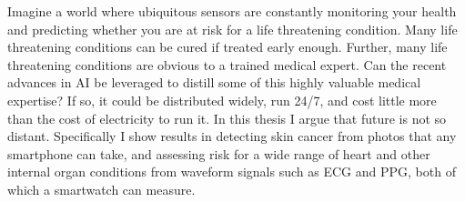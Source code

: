 Imagine a world where ubiquitous sensors are constantly monitoring your health and predicting whether you are at risk for a life threatening condition.  Many life threatening conditions can be cured if treated early enough.  Further, many life threatening conditions are obvious to a trained medical expert.  Can the recent advances in AI be leveraged to distill some of this highly valuable medical expertise?  If so, it could be distributed widely, run 24/7, and cost little more than the cost of electricity to run it.  In this thesis I argue that future is not so distant.  Specifically I show results in detecting skin cancer from photos that any smartphone can take, and assessing risk for a wide range of heart and other internal organ conditions from waveform signals such as ECG and PPG, both of which a smartwatch can measure.